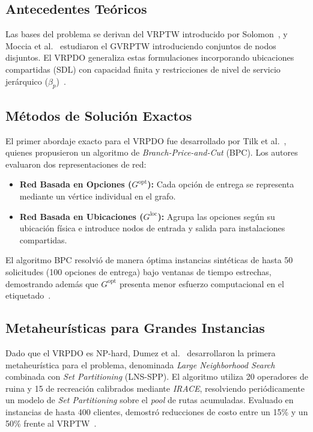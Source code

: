 \documentclass[letter, 10pt]{article}
\begin{document}
\subsection{Antecedentes Teóricos} 
Las bases del problema se derivan del VRPTW introducido por Solomon~\cite{Solomon87Algorithms}, y Moccia et al.~\cite{Moccia12Incremental} estudiaron el GVRPTW introduciendo conjuntos de nodos disjuntos. El VRPDO generaliza estas formulaciones incorporando ubicaciones compartidas (SDL) con capacidad finita y restricciones de nivel de servicio jerárquico ($\beta_p$)~\cite{Tilk21LastMile, Dumez21Large}. 

\subsection{Métodos de Solución Exactos} 
El primer abordaje exacto para el VRPDO fue desarrollado por Tilk et al.~\cite{Tilk21LastMile}, quienes propusieron un algoritmo de \emph{Branch-Price-and-Cut} (BPC). Los autores evaluaron dos representaciones de red: 
\begin{itemize} 
    \item \textbf{Red Basada en Opciones ($G^{\text{opt}}$):} Cada opción de entrega se representa mediante un vértice individual en el grafo. 
    \item \textbf{Red Basada en Ubicaciones ($G^{\text{loc}}$):} Agrupa las opciones según su ubicación física e introduce nodos de entrada y salida para instalaciones compartidas. 
\end{itemize} 
El algoritmo BPC resolvió de manera óptima instancias sintéticas de hasta 50 solicitudes (100 opciones de entrega) bajo ventanas de tiempo estrechas, demostrando además que $G^{\text{opt}}$ presenta menor esfuerzo computacional en el etiquetado~\cite{Tilk21LastMile}. 
\subsection{Metaheurísticas para Grandes Instancias} 
Dado que el VRPDO es NP-hard, Dumez et al.~\cite{Dumez21Large} desarrollaron la primera metaheurística para el problema, denominada \emph{Large Neighborhood Search} combinada con \emph{Set Partitioning} (LNS-SPP). El algoritmo utiliza 20 operadores de ruina y 15 de recreación calibrados mediante \emph{IRACE}, resolviendo periódicamente un modelo de \emph{Set Partitioning} sobre el \emph{pool} de rutas acumuladas. Evaluado en instancias de hasta 400 clientes, demostró reducciones de costo entre un 15\% y un 50\% frente al VRPTW~\cite{Dumez21Large}. 
\end{document}
